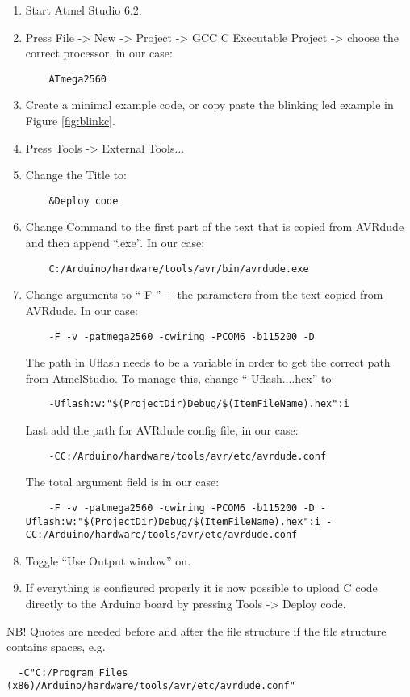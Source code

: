 \begin{enumerate}
    \item Start Atmel Studio 6.2.
    \item Press File -> New -> Project -> GCC C Executable Project -> choose the correct processor, in our case:
    \begin{lstlisting}
    ATmega2560
    \end{lstlisting}
    \item Create a minimal example code, or copy paste the blinking led example in Figure \ref{fig:blinkc}.
    \item Press Tools -> External Tools...
    \item Change the Title to: 
    \begin{lstlisting}
    &Deploy code
    \end{lstlisting}
    \item Change Command to the first part of the text that is copied from AVRdude and then append ``.exe''. In our case:
    \begin{lstlisting}
    C:/Arduino/hardware/tools/avr/bin/avrdude.exe
    \end{lstlisting}
    \item Change arguments to ``-F '' + the parameters from the text copied from AVRdude. In our case:
    \begin{lstlisting}
    -F -v -patmega2560 -cwiring -PCOM6 -b115200 -D 
    \end{lstlisting}
    The path in Uflash needs to be a variable in order to get the correct path from AtmelStudio. To manage this, change ``-Uflash....hex'' to:
    \begin{lstlisting}
    -Uflash:w:"$(ProjectDir)Debug/$(ItemFileName).hex":i
    \end{lstlisting}
    Last add the path for AVRdude config file, in our case:
    \begin{lstlisting}
    -CC:/Arduino/hardware/tools/avr/etc/avrdude.conf
    \end{lstlisting}
    
    
    The total argument field is in our case:
    \begin{lstlisting}
    -F -v -patmega2560 -cwiring -PCOM6 -b115200 -D -Uflash:w:"$(ProjectDir)Debug/$(ItemFileName).hex":i -CC:/Arduino/hardware/tools/avr/etc/avrdude.conf
    \end{lstlisting}
    
    \item Toggle ``Use Output window'' on.
    \item If everything is configured properly it is now possible to upload C code directly to the Arduino board by pressing Tools -> Deploy code.
\end{enumerate}
NB! Quotes are needed before and after the file structure if the file structure contains spaces, e.g.
\begin{lstlisting}
  -C"C:/Program Files (x86)/Arduino/hardware/tools/avr/etc/avrdude.conf"
\end{lstlisting}


